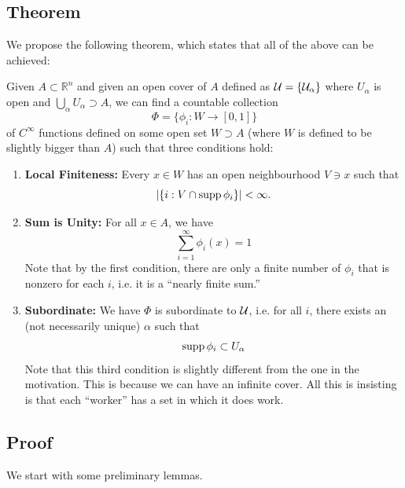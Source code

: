 \documentclass{article}
\numberwithin{equation}{section}
\begin{document}
\subsection{Theorem}
We propose the following theorem, which states that all of the above can be achieved:
\begin{theorem}
    Given $A\subset \mathbb{R}^n$ and given an open cover of $A$ defined as $\cal{U} = \{U_\alpha\}$ where $U_\alpha$ is open and $\bigcup_\alpha U_\alpha \supset A$, we can find a countable collection 
    \begin{equation}
        \Phi = \{\phi_i: W\rightarrow [0,1]\}
    \end{equation}
    of $C^\infty$ functions defined on some open set $W \supset A$ (where $W$ is defined to be slightly bigger than $A$) such that three conditions hold:
    \begin{enumerate}
        \item \textbf{Local Finiteness:} Every $x\in W$ has an open neighbourhood $V\ni x$ such that 
        \begin{equation}
            \left|\{i: V\cap \operatorname{supp} \phi_i \} \right| < \infty.
        \end{equation}
        \item \textbf{Sum is Unity:} For all $x\in A$, we have
        \begin{equation}
            \sum_{i=1}^\infty \phi_i(x) = 1
        \end{equation}
        Note that by the first condition, there are only a finite number of $\phi_i$ that is nonzero for each $i$, i.e. it is a ``nearly finite sum.''
        \item \textbf{Subordinate:} We have $\Phi$ is subordinate to $\cal{U}$, i.e. for all $i$, there exists an (not necessarily unique) $\alpha$ such that
        \begin{equation}
            \operatorname{supp} \phi_i \subset U_\alpha
        \end{equation}
        Note that this third condition is slightly different from the one in the motivation. This is because we can have an infinite cover. All this is insisting is that each ``worker'' has a set in which it does work.
    \end{enumerate}
\end{theorem}
\subsection{Proof}
We start with some preliminary lemmas.
\end{document}
